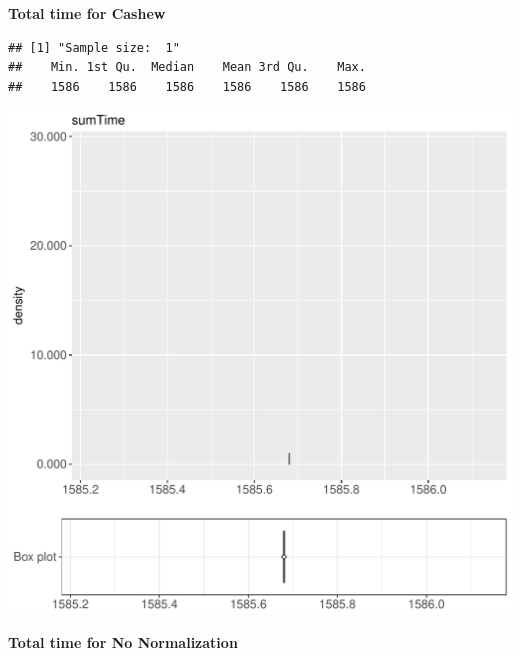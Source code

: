 \documentclass{article}\usepackage[]{graphicx}\usepackage[]{color}
\makeatletter
\def\maxwidth{ %
  \ifdim\Gin@nat@width>\linewidth
    \linewidth
  \else
    \Gin@nat@width
  \fi
}
\newenvironment{kframe}{%
 \def\at@end@of@kframe{}%
 \ifinner\ifhmode%
  \def\at@end@of@kframe{\end{minipage}}%
  \begin{minipage}{\columnwidth}%
 \fi\fi%
 \def\FrameCommand##1{\hskip\@totalleftmargin \hskip-\fboxsep
 \colorbox{shadecolor}{##1}\hskip-\fboxsep
     \hskip-\linewidth \hskip-\@totalleftmargin \hskip\columnwidth}%
 \MakeFramed {\advance\hsize-\width
   \@totalleftmargin\z@ \linewidth\hsize
   \@setminipage}}%
 {\par\unskip\endMakeFramed%
 \at@end@of@kframe}
\newenvironment{knitrout}{}{} %
\makeatother
\begin{document}
 \textbf{Total time for Cashew}
\begin{knitrout}
\color{fgcolor}\begin{kframe}
\begin{verbatim}
## [1] "Sample size:  1"
##    Min. 1st Qu.  Median    Mean 3rd Qu.    Max. 
##    1586    1586    1586    1586    1586    1586
\end{verbatim}


{\ttfamily\noindent\bfseries{}}\end{kframe}
\includegraphics[width=\maxwidth]{figure/RH2_cashew_crime-1} 

\end{knitrout}
 \textbf{Total time for No Normalization}
\end{document}
